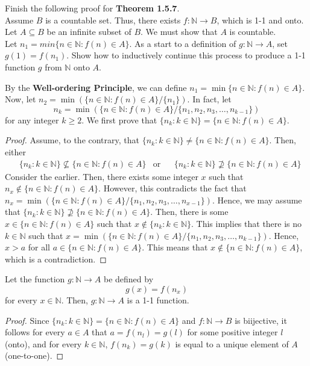 \documentclass[12pt]{article}
\newcommand{\N}{\mathbb{N}}
\newenvironment{problem}[2][Problem]{\begin{trivlist}
		\item[\hskip \labelsep {\bfseries #1}\hskip \labelsep {\bfseries #2.}]}{\end{trivlist}}
\newenvironment{solution}[2][Solution]{\begin{trivlist}
		\item[\hskip \labelsep {\bfseries #1}\hskip \labelsep {\bfseries #2.}]}{\end{trivlist}}
\begin{document}
	\begin{problem}{1.5.1}
		Finish the following proof for \textbf{Theorem 1.5.7}.\\
		Assume $B$ is a countable set. Thus, there exists $f:\N \to B$, which is 1-1 and onto. Let $A\subseteq B$ be an infinite subset of $B$. We must show that $A$ is countable.\\
		Let $n_{1} = min\{n\in \N:f(n)\in A\}$. As a start to a definition of $g:\N\to A$, set $g(1) = f(n_{1})$. Show how to inductively continue this process to produce a 1-1 function $g$ from $\N$ onto $A$.
		\begin{solution}{1.5.1}
			 By the \textbf{Well-ordering Principle}, we can define $n_{1} = \min\{n\in \N : f(n)\in A\}$.  Now, let $n_{2} = \min\left(\{n\in \N : f(n)\in A\}/\{n_{1}\}\right)$. In fact, let 
			 \begin{equation*}
			 n_{k} = \min\left(\{n\in \N : f(n)\in A\}/\{n_{1},n_{2},n_{3},\ldots,n_{k-1}\}\right)
			 \end{equation*}
		 	for any  integer $k\geq 2$. We first prove that $\{n_{k}:k\in \N\} = \{n\in \N : f(n)\in A\}$.
		 
		 	\begin{proof}
		 	Assume, to the contrary, that $\{n_{k}:k\in \N\} \neq \{n\in \N : f(n)\in A\}$. Then, either
		 	\begin{align*}
		 	 &\{n_{k}:k\in \N\} \not\subseteq \{n\in \N : f(n)\in A\} &\text{or}&   
		 	  &\{n_{k}:k\in \N\} \not\supseteq \{n\in \N : f(n)\in A\} 
		 	 \end{align*}
		 	 Consider the earlier. Then, there exists some integer $x$ such that  $n_{x}\not\in  \{n\in \N : f(n)\in A\}$. However, this contradicts the fact that $n_{x} = \min\left(\{n\in \N : f(n)\in A\}/\{n_{1},n_{2},n_{3},\ldots,n_{x-1}\}\right)$. Hence, we may assume that $\{n_{k}:k\in \N\} \not\supseteq \{n\in \N : f(n)\in A\}$. Then, there is some $x\in \{n\in \N : f(n)\in A\}$ such that $x\not\in \{n_{k}:k\in \N\}$. This implies that there is no $k\in \N$ such that $x = \min\left(\{n\in \N : f(n)\in A\}/\{n_{1},n_{2},n_{3},\ldots,n_{k-1}\}\right)$. Hence, $x>a$ for all $a\in \{n\in \N : f(n)\in A\}$. This means that $x\not\in \{n\in \N : f(n)\in A\}$, which is a contradiction. 
			 \end{proof}
	 
		 	 Let the function $g:\N \to A$ be defined by
		 	\begin{equation*}
		 		g(x) = f(n_{x})
		 	\end{equation*}
	 		for every $x\in \N$. Then, $g:\N \to A$ is a 1-1 function. 
	 		 
	 		\begin{proof}
	 			Since $\{n_{k}:k\in \N\} = \{n\in \N : f(n)\in A\}$ and $f:\N \to B$ is biijective, it follows for every $a\in A$ that $a = f(n_{l}) = g(l)$ for some positive integer $l$ (onto), and for every $k\in \N$, $f(n_{k}) = g(k)$ is equal to a unique element of $A$ (one-to-one).
	 		\end{proof}
		\end{solution}
	\end{problem}
\end{document}
